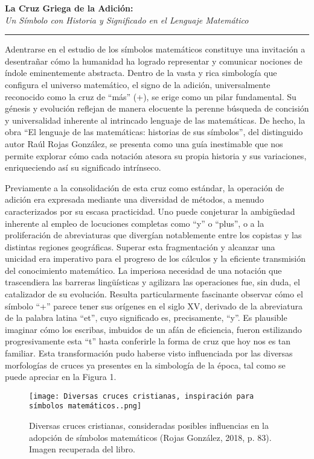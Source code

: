 \documentclass[11pt, a4paper]{article}
\newcommand{\ensayoTitulo}[2]{%
  \begin{center}
    \vspace*{1cm}
    {\fontsize{36}{38}\selectfont\textbf{#1}} \\
    \vspace{0.4cm}
    {\fontsize{18}{20}\selectfont\textit{#2}}
    \vspace*{1.5cm}
    \hrule
    \vspace*{0.3cm}
  \end{center}
}
\begin{document}
\ensayoTitulo{La Cruz Griega de la Adición:}{Un Símbolo con Historia y Significado en el Lenguaje Matemático}

Adentrarse en el estudio de los símbolos matemáticos constituye una invitación a desentrañar cómo la humanidad ha logrado representar y comunicar nociones de índole eminentemente abstracta. Dentro de la vasta y rica simbología que configura el universo matemático, el signo de la adición, universalmente reconocido como la cruz de ``más'' (+), se erige como un pilar fundamental. Su génesis y evolución reflejan de manera elocuente la perenne búsqueda de concisión y universalidad inherente al intrincado lenguaje de las matemáticas. De hecho, la obra ``El lenguaje de las matemáticas: historias de sus símbolos'', del distinguido autor Raúl Rojas González, se presenta como una guía inestimable que nos permite explorar cómo cada notación atesora su propia historia y sus variaciones, enriqueciendo así su significado intrínseco.

Previamente a la consolidación de esta cruz como estándar, la operación de adición era expresada mediante una diversidad de métodos, a menudo caracterizados por su escasa practicidad. Uno puede conjeturar la ambigüedad inherente al empleo de locuciones completas como ``y'' o ``plus'', o a la proliferación de abreviaturas que divergían notablemente entre los copistas y las distintas regiones geográficas. Superar esta fragmentación y alcanzar una unicidad era imperativo para el progreso de los cálculos y la eficiente transmisión del conocimiento matemático. La imperiosa necesidad de una notación que trascendiera las barreras lingüísticas y agilizara las operaciones fue, sin duda, el catalizador de su evolución. Resulta particularmente fascinante observar cómo el símbolo ``+'' parece tener sus orígenes en el siglo XV, derivado de la abreviatura de la palabra latina ``et'', cuyo significado es, precisamente, ``y''. Es plausible imaginar cómo los escribas, imbuidos de un afán de eficiencia, fueron estilizando progresivamente esta ``t'' hasta conferirle la forma de cruz que hoy nos es tan familiar. Esta transformación pudo haberse visto influenciada por las diversas morfologías de cruces ya presentes en la simbología de la época, tal como se puede apreciar en la Figura 1.

\begin{figure}[H]
    \centering
    \texttt{[image: Diversas cruces cristianas, inspiración para símbolos matemáticos..png]}
    \caption{Diversas cruces cristianas, consideradas posibles influencias en la adopción de símbolos matemáticos (Rojas González, 2018, p. 83). Imagen recuperada del libro.}
    \label{fig:cruces}
\end{figure}
\end{document}

